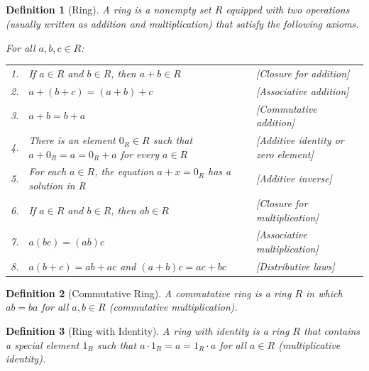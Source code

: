 \documentclass{article}
\theoremstyle{break}
\newtheorem{definition}{Definition}[subsection]
\begin{document}
\subsection{}

\begin{definition}[Ring]
  A ring is a nonempty set $R$ equipped with two operations (usually written as
  addition and multiplication) that satisfy the following axioms.

  For all $a, b, c \in R$:

  \renewcommand{\arraystretch}{1.5}
  \begin{tabular}{l p{6cm} p{4cm}}
    1. & If $a \in R$ and $b \in R$, then $a + b \in R$ & [Closure for
    addition] \\

    2. & $a + (b + c) = (a + b) + c$ & [Associative addition] \\

    3. & $a + b = b + a$ & [Commutative addition] \\

    4. & There is an element $0_R \in R$ such that $a + 0_R = a = 0_R + a$ for
    every $a \in R$ & [Additive identity or zero element] \\

    5. & For each $a \in R$, the equation $a+x=0_R$ has a solution in R &
    [Additive inverse] \\

    6. & If $a \in R$ and $b \in R$, then $ab \in R$ & [Closure for
    multiplication] \\

    7. & $a(bc) = (ab)c$ & [Associative multiplication] \\

    8. & $a(b + c) = ab + ac$ and $(a + b )c = ac + bc$ & [Distributive laws]
    \\
  \end{tabular}
\end{definition}

\begin{definition}[Commutative Ring]
  A commutative ring is a ring $R$ in which $ab = ba$ for all $a, b \in R$
  (commutative multiplication).
\end{definition}

\begin{definition}[Ring with Identity] A ring with identity is a ring $R$ that
  contains a special element $1_R$ such that $a \cdot 1_R = a = 1_R \cdot a$
  for all $a \in R$ (multiplicative identity).
\end{definition}
\end{document}
